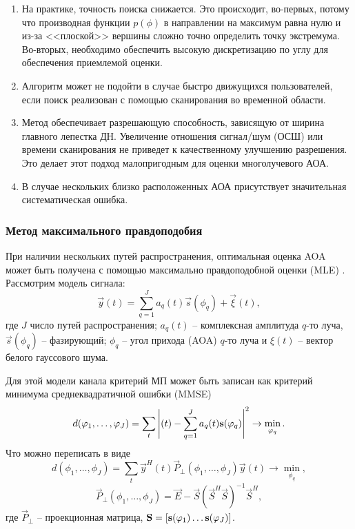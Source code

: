 \begin{enumerate}
    \item На практике, точность поиска снижается.
          Это происходит, во-первых,  потому что производная функции $p(\phi)$
          в направлении на максимум равна нулю и из-за <<плоской>> вершины сложно
          точно определить точку экстремума. Во-вторых, необходимо
          обеспечить высокую дискретизацию по углу для обеспечения приемлемой
          оценки.
    \item Алгоритм может не подойти в случае быстро движущихся пользователей, если поиск реализован с помощью сканирования во временной области.
    \item Метод обеспечивает разрешающую способность, зависящую
          от ширина главного лепестка ДН. Увеличение отношения сигнал/шум (ОСШ) или времени
          сканирования не приведет к качественному улучшению разрешения.  Это делает
          этот подход малопригодным для оценки многолучевого АОА.
    \item В случае нескольких близко расположенных АОА присутствует
          значительная систематическая ошибка.
\end{enumerate}


\subsubsection{Метод максимального правдоподобия}%
\label{sub:metod_maksimal_nogo_pravdopodobiia}
При наличии нескольких путей распространения, оптимальная оценка AOA может быть
получена с помощью максимально правдоподобной оценки (MLE) \cite{Tuncer2009}. 
Рассмотрим модель сигнала:
\begin{equation}
    \label{eq:3.8}
    \vec y(t) = \sum\limits_{q=1}^{J} a_q(t)\vec s(\phi_q) + \vec \xi(t),
\end{equation}
где $J$ число путей распространения; $a_q(t)$ -- комплексная амплитуда $q$-то
луча, $\vec s(\phi_q)$ -- фазирующий;  $\phi_q$ -- угол прихода (AOA) $q$-то
луча и $\xi(t)$ -- вектор белого гауссового шума.

Для этой модели канала критерий МП может быть записан как критерий минимума
среднеквадратичной ошибки (MMSE)
\begin{equation}
    \label{eq:}
    d(\phi_1, \hdots, \phi_J) = \sum\limits_{t}^{} \abs{\vec(t) -
        \sum\limits_{q=1}^{J} a_q(t) \vec s(\phi_q)}^2 \to \min_{\phi_q}.
\end{equation}
Что можно переписать в виде
\begin{equation}
    \label{eq:}
    d(\phi_1, \hdots, \phi_J) = \sum\limits_{t}^{} \vec y^H(t) \vec
    P_\perp(\phi_1, \hdots, \phi_J) \vec y(t) \to \min_{\phi_q},
\end{equation}
\begin{equation}
    \label{eq:}
    \vec P_\perp(\phi_1, \hdots, \phi_J) = \vec E - \vec S(\vec S^H \vec S)^{-1}
    \vec S^H,
\end{equation}
где $\vec P_\perp$ -- проекционная матрица, 
$\vec S = \qty[\vec s(\phi_1) \dots \vec s (\phi_J)]$. 


